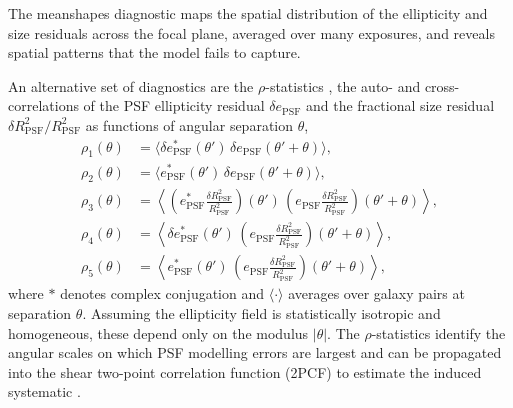 \documentclass[11pt]{book}
\begin{document}
The meanshapes diagnostic maps the spatial distribution of the ellipticity and size residuals across the focal plane, averaged over many exposures, and reveals spatial patterns that the model fails to capture.

An alternative set of diagnostics are the $\rho$-statistics \cite{rowe2010,jarvis2016}, the auto- and cross-correlations of the PSF ellipticity residual $\delta e_{\mathrm{PSF}}$ and the fractional size residual $\delta R^2_{\mathrm{PSF}}/R^2_{\mathrm{PSF}}$ as functions of angular separation $\theta$,
\begin{align}
\rho_1(\theta) &= \big\langle \delta e_{\mathrm{PSF}}^{*}(\theta')\,\delta e_{\mathrm{PSF}}(\theta'+\theta)\big\rangle, \label{eq:rho1}\\
\rho_2(\theta) &= \big\langle e_{\mathrm{PSF}}^{*}(\theta')\,\delta e_{\mathrm{PSF}}(\theta'+\theta)\big\rangle, \\
\rho_3(\theta) &= \left\langle \left(e_{\mathrm{PSF}}^{*}\tfrac{\delta R^2_{\mathrm{PSF}}}{R^2_{\mathrm{PSF}}}\right)\!(\theta')\,\left(e_{\mathrm{PSF}}\tfrac{\delta R^2_{\mathrm{PSF}}}{R^2_{\mathrm{PSF}}}\right)\!(\theta'+\theta)\right\rangle, \\
\rho_4(\theta) &= \left\langle \delta e_{\mathrm{PSF}}^{*}(\theta')\,\left(e_{\mathrm{PSF}}\tfrac{\delta R^2_{\mathrm{PSF}}}{R^2_{\mathrm{PSF}}}\right)\!(\theta'+\theta)\right\rangle, \\
\rho_5(\theta) &= \left\langle e_{\mathrm{PSF}}^{*}(\theta')\,\left(e_{\mathrm{PSF}}\tfrac{\delta R^2_{\mathrm{PSF}}}{R^2_{\mathrm{PSF}}}\right)\!(\theta'+\theta)\right\rangle, \label{eq:rho5}
\end{align}
where $*$ denotes complex conjugation and $\langle\cdot\rangle$ averages over galaxy pairs at separation $\theta$. Assuming the ellipticity field is statistically isotropic and homogeneous, these depend only on the modulus $|\theta|$. The $\rho$-statistics identify the angular scales on which PSF modelling errors are largest and can be propagated into the shear two-point correlation function (2PCF) to estimate the induced systematic \cite{jarvis2020}.
\end{document}

